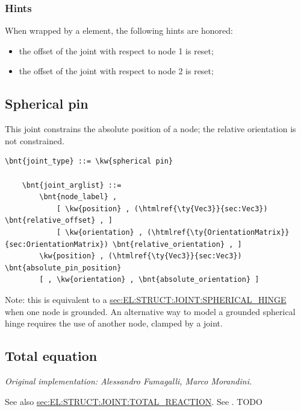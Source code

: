 \subsubsection{Hints}
When wrapped by a  element, the following hints are honored:
\begin{itemize}
\item {} the offset of the joint
with respect to node 1 is reset;
\item {} the offset of the joint
with respect to node 2 is reset;
\end{itemize}

\subsection{Spherical pin}
This joint constrains the absolute position of a node;
the relative orientation is not constrained.
\begin{Verbatim}[commandchars=\\\{\}]
    \bnt{joint_type} ::= \kw{spherical pin}

    \bnt{joint_arglist} ::=
        \bnt{node_label} ,
            [ \kw{position} , (\htmlref{\ty{Vec3}}{sec:Vec3}) \bnt{relative_offset} , ]
            [ \kw{orientation} , (\htmlref{\ty{OrientationMatrix}}{sec:OrientationMatrix}) \bnt{relative_orientation} , ]
        \kw{position} , (\htmlref{\ty{Vec3}}{sec:Vec3}) \bnt{absolute_pin_position}
        [ , \kw{orientation} , \bnt{absolute_orientation} ]   
\end{Verbatim}
Note: this is equivalent to a
\hyperref{\kw{spherical hinge}}{\kw{spherical hinge} (see Section~}{)}{sec:EL:STRUCT:JOINT:SPHERICAL_HINGE}
when one node is grounded.
An alternative way to model a grounded spherical hinge requires
the use of another node, clamped by a  joint.



\subsection{Total equation}
\label{sec:EL:STRUCT:JOINT:TOTAL_EQUATION}
\emph{Original implementation: Alessandro Fumagalli, Marco Morandini.}

See also
\hyperref{\kw{total reaction}}{\kw{total reaction} (see Section~}{)}{sec:EL:STRUCT:JOINT:TOTAL_REACTION}.
See \cite{FUMAGALLI-CND-2011}.
TODO



